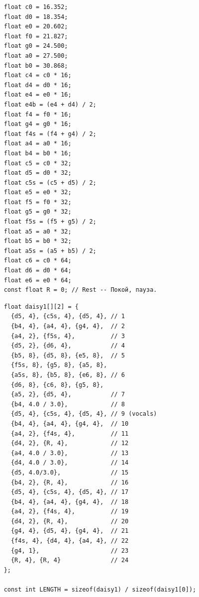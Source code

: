 \documentclass[../sparc.tex]{subfiles}
\begin{document}
\begin{listing}[ht]
  \small
  \begin{verbatim}
    float c0 = 16.352;
    float d0 = 18.354;
    float e0 = 20.602;
    float f0 = 21.827;
    float g0 = 24.500;
    float a0 = 27.500;
    float b0 = 30.868;
    float c4 = c0 * 16;
    float d4 = d0 * 16;
    float e4 = e0 * 16;
    float e4b = (e4 + d4) / 2;
    float f4 = f0 * 16;
    float g4 = g0 * 16;
    float f4s = (f4 + g4) / 2;
    float a4 = a0 * 16;
    float b4 = b0 * 16;
    float c5 = c0 * 32;
    float d5 = d0 * 32;
    float c5s = (c5 + d5) / 2;
    float e5 = e0 * 32;
    float f5 = f0 * 32;
    float g5 = g0 * 32;
    float f5s = (f5 + g5) / 2;
    float a5 = a0 * 32;
    float b5 = b0 * 32;
    float a5s = (a5 + b5) / 2;
    float c6 = c0 * 64;
    float d6 = d0 * 64;
    float e6 = e0 * 64;
    const float R = 0; // Rest -- Покой, пауза.
  \end{verbatim}
  \caption{Ноты, необходимые для мелодии ``Daisy Bell''.}
  \label{listing:mcu-music-2-1}
\end{listing}

\begin{listing}[ht]
  \small
  \begin{verbatim}
    float daisy1[][2] = {
      {d5, 4}, {c5s, 4}, {d5, 4}, // 1
      {b4, 4}, {a4, 4}, {g4, 4},  // 2
      {a4, 2}, {f5s, 4},          // 3
      {d5, 2}, {d6, 4},           // 4
      {b5, 8}, {d5, 8}, {e5, 8},  // 5
      {f5s, 8}, {g5, 8}, {a5, 8},
      {a5s, 8}, {b5, 8}, {e6, 8}, // 6
      {d6, 8}, {c6, 8}, {g5, 8},
      {a5, 2}, {d5, 4},           // 7
      {b4, 4.0 / 3.0},            // 8
      {d5, 4}, {c5s, 4}, {d5, 4}, // 9 (vocals)
      {b4, 4}, {a4, 4}, {g4, 4},  // 10
      {a4, 2}, {f4s, 4},          // 11
      {d4, 2}, {R, 4},            // 12
      {a4, 4.0 / 3.0},            // 13
      {d4, 4.0 / 3.0},            // 14
      {d5, 4.0/3.0},              // 15
      {b4, 2}, {R, 4},            // 16
      {d5, 4}, {c5s, 4}, {d5, 4}, // 17
      {b4, 4}, {a4, 4}, {g4, 4},  // 18
      {a4, 2}, {f4s, 4},          // 19
      {d4, 2}, {R, 4},            // 20
      {g4, 4}, {d5, 4}, {g4, 4},  // 21
      {f4s, 4}, {d4, 4}, {a4, 4}, // 22
      {g4, 1},                    // 23
      {R, 4}, {R, 4}              // 24
    };

    const int LENGTH = sizeof(daisy1) / sizeof(daisy1[0]);
  \end{verbatim}
  \caption{Часть мелодии ``Daisy Bell''.}
  \label{listing:mcu-music-2-2}
\end{listing}
\end{document}

